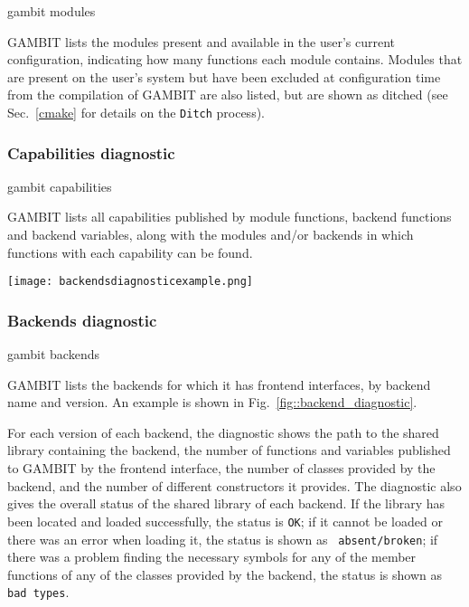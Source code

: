 \documentclass[pdftex,twocolumn,epjc3_preprint,runningheads]{svjour3}
\renewcommand{\_}{\discretionary{\underscore}{}{\underscore}}
\newcommand\term[1]{{\lstset{style=terminal}\lstinline!#1!\lstset{style=cpp}}}
\newcommand{\gambit}{\textsf{GAMBIT}\xspace}
\newcommand{\GB}{\gambit}
\begin{document}
\begin{lstterm}
gambit modules
\end{lstterm}
\GB lists the modules present and available in the user's current configuration, indicating how many functions each module contains.  Modules that are present on the user's system but have been excluded at configuration time from the compilation of \GB are also listed, but are shown as ditched (see Sec.\ \ref{cmake} for details on the \term{Ditch} process).

\subsubsection{Capabilities diagnostic}
\label{capabilities diagnostic}

\begin{lstterm}
gambit capabilities
\end{lstterm}
\GB lists all capabilities published by module functions, backend functions and backend variables, along with the modules and/or backends in which functions with each capability can be found.

\begin{figure*}[tp]
\centering
\texttt{[image: backends\_diagnostic\_example.png]}
\caption{Example output of the backends diagnostic mode, showing the statuses and locations of different backend libraries configured for use with \GB.}
\label{fig::backend_diagnostic}
\end{figure*}

\subsubsection{Backends diagnostic}
\label{backends diagnostic}

\begin{lstterm}
gambit backends
\end{lstterm}
\GB lists the backends for which it has frontend interfaces, by backend name and version.  An example is shown in Fig.\ \ref{fig::backend_diagnostic}.

For each version of each backend, the diagnostic shows the path to the shared library containing the backend, the number of functions and variables published to \GB by the frontend interface, the number of classes provided by the backend, and the number of different constructors it provides.  The diagnostic also gives the overall status of the shared library of each backend.  If the library has been located and loaded successfully, the status is \texttt{\color{Green}OK}; if it cannot be loaded or there was an error when loading it, the status is shown as \texttt{\color{red} absent/broken}; if there was a problem finding the necessary symbols for any of the member functions of any of the classes provided by the backend, the status is shown as \texttt{\color{red}bad types}.
\end{document}
